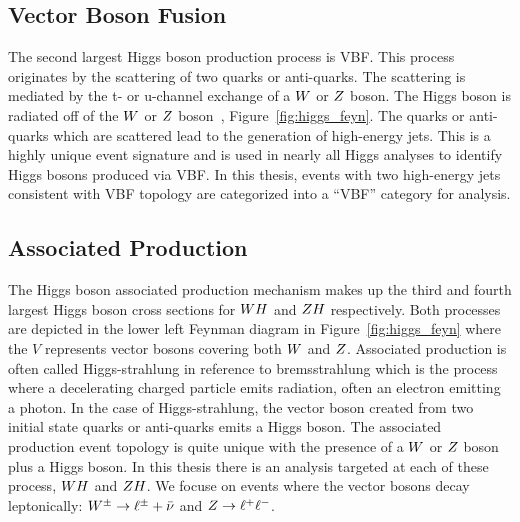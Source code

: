 \subsection{Vector Boson Fusion}
The second largest Higgs boson production process is VBF. This process originates by
the scattering of two quarks or anti-quarks. The scattering is mediated by the t-
or u-channel exchange of a $W$ or $Z$ boson. The Higgs boson is radiated off
of the $W$ or $Z$ boson~\cite{PhysRevD.70.113009}, Figure~\ref{fig:higgs_feyn}. 
The quarks or anti-quarks which are scattered
lead to the generation of high-energy jets.
This is a highly unique event signature and is used in nearly all Higgs analyses
to identify Higgs bosons produced via VBF. In this thesis, events with two high-energy
jets consistent with VBF topology are categorized into a ``VBF'' category for analysis.


\subsection{Associated Production}
The Higgs boson associated production mechanism makes up the third and fourth largest
Higgs boson cross sections for $WH$ and $ZH$ respectively. Both processes are 
depicted in the lower left Feynman diagram in Figure~\ref{fig:higgs_feyn} where
the $V$ represents vector bosons covering both $W$ and $Z$. Associated
production is often called Higgs-strahlung in reference to bremsstrahlung which is the
process where a decelerating charged particle emits radiation, often an electron
emitting a photon. In the case of Higgs-strahlung, the vector boson created 
from two initial state quarks or anti-quarks emits a Higgs boson. The associated
production event topology is quite unique with the presence of a $W$ or $Z$
boson plus a Higgs boson. In this thesis there is an analysis targeted at each
of these process, $WH$ and $ZH$. We focuse on events where the vector
bosons decay leptonically: $W^{\pm} \to \ell^{\pm} + \bar{\nu}$ and $Z \to \ell^{+}\ell^{-}$.



